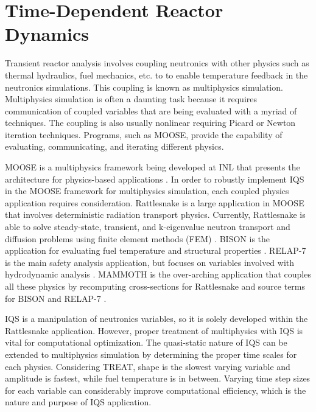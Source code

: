 \section{Time-Dependent Reactor Dynamics}

Transient reactor analysis  involves coupling neutronics with other physics such as thermal hydraulics, fuel mechanics, etc. to to enable temperature feedback in the neutronics simulations. This coupling is known as multiphysics simulation. Multiphysics simulation is often a daunting task because it requires communication of coupled variables that are being evaluated with a myriad of techniques. The coupling is also usually nonlinear requiring Picard or Newton iteration techniques. Programs, such as MOOSE, provide the capability of evaluating, communicating, and iterating different physics. 

MOOSE is a multiphysics framework being developed at INL that presents the architecture for physics-based applications \cite{moose}.  In order to robustly implement IQS in the MOOSE framework for multiphysics simulation, each coupled physics application requires consideration. Rattlesnake is a large application in MOOSE that involves deterministic radiation transport physics.  Currently, Rattlesnake is able to solve steady-state, transient, and k-eigenvalue neutron transport and diffusion problems using finite element methods (FEM) \cite{wang2013}. BISON is the application for evaluating fuel temperature and structural properties \cite{bison}.  RELAP-7 is the main safety analysis application, but focuses on variables involved with hydrodynamic analysis \cite{relap7}.  MAMMOTH is the over-arching application that couples all these physics by recomputing cross-sections for Rattlesnake and source terms for BISON and RELAP-7 \cite{mammoth}.

IQS is a manipulation of neutronics variables, so it is solely developed within the Rattlesnake application. However, proper treatment of multiphysics with IQS is vital for computational optimization.  The quasi-static nature of IQS can be extended to multiphysics simulation by determining the proper time scales for each physics.  Considering TREAT, shape is the slowest varying variable and amplitude is fastest, while fuel temperature is in between.  Varying time step sizes for each variable can considerably improve computational efficiency, which is the nature and purpose of IQS application.

